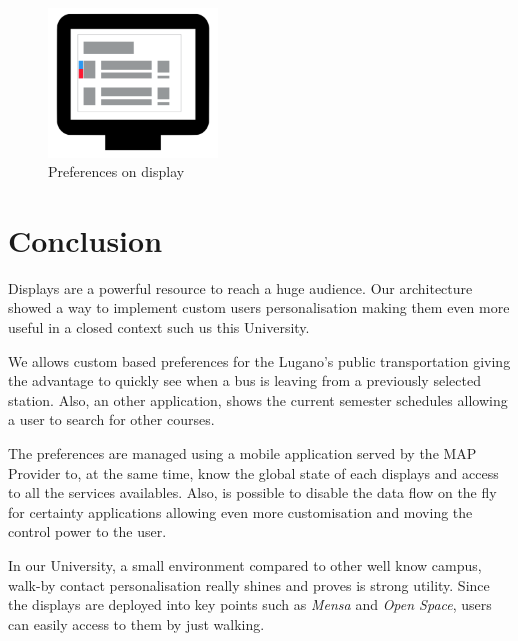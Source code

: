 \documentclass[]{usiinfbachelorproject}
\begin{document}
\begin{figure}[H]
  \centering
\includegraphics[width=0.4\textwidth]{./images/preference_colour/preference_splited}
  \caption{Preferences on display}

\end{figure}
\newpage
\section{Conclusion}
Displays are a powerful resource to reach a huge audience. Our architecture showed a way to implement custom users personalisation making them even more useful in a closed context such us this University. 

We allows custom based preferences for the Lugano's public transportation giving the advantage to quickly see when a bus is leaving from a previously selected station. Also, an other application, shows the current semester schedules allowing a user to search for other courses.

The preferences are managed using a mobile application served by the MAP Provider to, at the same time, know the global state of each displays and access to all the services availables. Also, is possible to disable the data flow on the fly for certainty applications allowing even more customisation and moving the control power to the user.

In our University, a small environment compared to other well know campus, walk-by contact personalisation really shines and proves is strong utility. Since the displays are deployed into key points such as \emph{Mensa} and \emph{Open Space}, users can easily access to them by just walking.

\newpage


\end{document}
